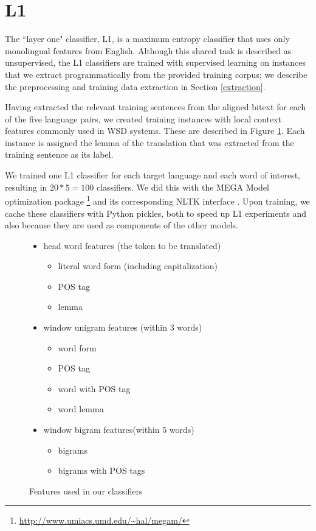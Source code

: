 \documentclass[11pt,letterpaper]{article}
\begin{document}
\section{L1}
The ``layer one" classifier, L1, is a maximum entropy classifier that
uses only monolingual features from English. Although this shared task is
described as unsupervised, the L1 classifiers are trained with supervised
learning on instances that we extract programmatically from the provided
training corpus; we describe the preprocessing and training data extraction in
Section \ref{extraction}.

Having extracted the relevant training sentences from the aligned bitext for
each of the five language pairs, we created training instances with local
context features commonly used in WSD systems. These are described in Figure
\ref{fig:features}. Each instance is assigned the lemma of the translation that
was extracted from the training sentence as its label.

We trained one L1 classifier for each target language and each word of
interest, resulting in $20*5 = 100$ classifiers. We did this with the MEGA
Model optimization package \cite{daume04cg-bfgs}
\footnote{\url{http://www.umiacs.umd.edu/~hal/megam/}} and its corresponding
NLTK interface \cite{nltkbook}. Upon training, we cache these classifiers with
Python pickles, both to speed up L1 experiments and also because they are used
as components of the other models.

\begin{figure}
  \begin{itemize}  %
  
  \item head word features (the token to be translated)
  \begin{itemize}  %
       \item literal word form (including capitalization)
       \item POS tag
       \item lemma
  \end{itemize}
  \item window unigram features (within 3 words)
  \begin{itemize} %
  		\item word form
  		\item POS tag
  		\item word with POS tag
  		\item word lemma
  \end{itemize}
  \item window bigram features(within 5 words)
  \begin{itemize} %
  		\item bigrams 
  		\item bigrams with POS tags
  \end{itemize}  
  \end{itemize}   %
  \caption{Features used in our classifiers}
  \label{fig:features}
\end{figure}
\end{document}
